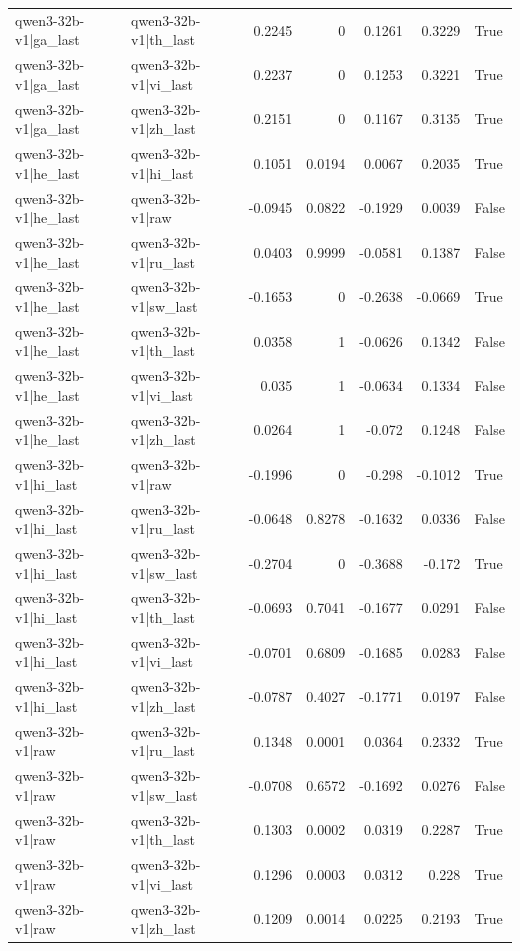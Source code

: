 \begin{table}
\begin{tabular}{l l r r r r l}
qwen3-32b-v1|ga_last & qwen3-32b-v1|th_last & 0.2245 & 0 & 0.1261 & 0.3229 & True \\
qwen3-32b-v1|ga_last & qwen3-32b-v1|vi_last & 0.2237 & 0 & 0.1253 & 0.3221 & True \\
qwen3-32b-v1|ga_last & qwen3-32b-v1|zh_last & 0.2151 & 0 & 0.1167 & 0.3135 & True \\
qwen3-32b-v1|he_last & qwen3-32b-v1|hi_last & 0.1051 & 0.0194 & 0.0067 & 0.2035 & True \\
qwen3-32b-v1|he_last & qwen3-32b-v1|raw & -0.0945 & 0.0822 & -0.1929 & 0.0039 & False \\
qwen3-32b-v1|he_last & qwen3-32b-v1|ru_last & 0.0403 & 0.9999 & -0.0581 & 0.1387 & False \\
qwen3-32b-v1|he_last & qwen3-32b-v1|sw_last & -0.1653 & 0 & -0.2638 & -0.0669 & True \\
qwen3-32b-v1|he_last & qwen3-32b-v1|th_last & 0.0358 & 1 & -0.0626 & 0.1342 & False \\
qwen3-32b-v1|he_last & qwen3-32b-v1|vi_last & 0.035 & 1 & -0.0634 & 0.1334 & False \\
qwen3-32b-v1|he_last & qwen3-32b-v1|zh_last & 0.0264 & 1 & -0.072 & 0.1248 & False \\
qwen3-32b-v1|hi_last & qwen3-32b-v1|raw & -0.1996 & 0 & -0.298 & -0.1012 & True \\
qwen3-32b-v1|hi_last & qwen3-32b-v1|ru_last & -0.0648 & 0.8278 & -0.1632 & 0.0336 & False \\
qwen3-32b-v1|hi_last & qwen3-32b-v1|sw_last & -0.2704 & 0 & -0.3688 & -0.172 & True \\
qwen3-32b-v1|hi_last & qwen3-32b-v1|th_last & -0.0693 & 0.7041 & -0.1677 & 0.0291 & False \\
qwen3-32b-v1|hi_last & qwen3-32b-v1|vi_last & -0.0701 & 0.6809 & -0.1685 & 0.0283 & False \\
qwen3-32b-v1|hi_last & qwen3-32b-v1|zh_last & -0.0787 & 0.4027 & -0.1771 & 0.0197 & False \\
qwen3-32b-v1|raw & qwen3-32b-v1|ru_last & 0.1348 & 0.0001 & 0.0364 & 0.2332 & True \\
qwen3-32b-v1|raw & qwen3-32b-v1|sw_last & -0.0708 & 0.6572 & -0.1692 & 0.0276 & False \\
qwen3-32b-v1|raw & qwen3-32b-v1|th_last & 0.1303 & 0.0002 & 0.0319 & 0.2287 & True \\
qwen3-32b-v1|raw & qwen3-32b-v1|vi_last & 0.1296 & 0.0003 & 0.0312 & 0.228 & True \\
qwen3-32b-v1|raw & qwen3-32b-v1|zh_last & 0.1209 & 0.0014 & 0.0225 & 0.2193 & True \\

\end{tabular}
\end{table}
